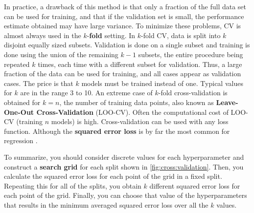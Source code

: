 \documentclass[10pt]{article}
\theoremstyle{definition}
\begin{document}
In practice, a drawback of this method is that only a fraction of the full data set can be used for training, and that if the validation set is small, the performance estimate obtained may have large variance. To minimize these problems, CV is almost always used in the $k$-\textbf{fold} setting. In $k$-fold CV, data is split into $k$ disjoint equally sized subsets. Validation is done on a single subset and training is done using the union of the remaining $k -1$ subsets, the entire procedure being repeated $k$ times, each time with a different subset for validation. Thus, a large fraction of the data can be used for training, and all cases appear as validation cases. The price is that $k$ models must be trained instead of one. Typical values for $k$ are in the range 3 to 10. An extreme case of $k$-fold cross-validation is obtained for $k = n$, the number of training data points, also known as \textbf{Leave-One-Out Cross-Validation} (LOO-CV). Often the computational cost of LOO-CV (training $n$ models) is high. Cross-validation can be used with any loss function. Although the \textbf{squared error loss} is by far the most common for regression \cite[Chapter 5]{Rasmussen2006}. 

To summarize, you should consider discrete values for each hyperparameter and construct a \textbf{search grid} for each split shown in \cref{fig:cross:validation}. Then, you calculate the squared error loss for each point of the grid in a fixed split. Repeating this for all of the splits, you obtain $k$ different squared error loss for each point of the grid. Finally, you can choose that value of the hyperparameters that results in the minimum averaged squared error loss over all the $k$ values.
\end{document}

